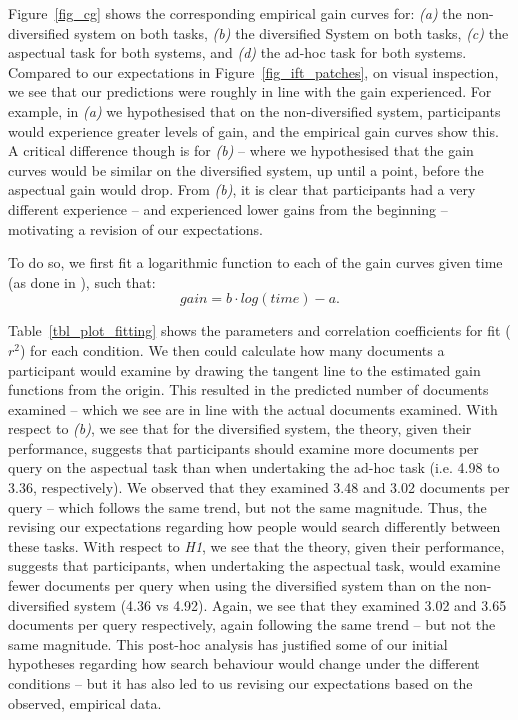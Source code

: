 Figure~\ref{fig_cg} shows the corresponding empirical gain curves for: \textit{(a)} the non-diversified system on both tasks, \textit{(b)} the diversified System on both tasks, \textit{(c)} the aspectual task for both systems, and \textit{(d)} the ad-hoc task for both systems. Compared to our expectations in Figure~\ref{fig_ift_patches}, on visual inspection, we see that our predictions were roughly in line with the gain experienced. For example, in \textit{(a)} we hypothesised that on the non-diversified system, participants would experience greater levels of gain, and the empirical gain curves show this. A critical difference though is for \textit{(b)} -- where we hypothesised that the gain curves would be similar on the diversified system, up until a point, before the aspectual gain would drop. From \textit{(b)}, it is clear that participants had a very different experience -- and experienced lower gains from the beginning -- motivating a revision of our expectations.

To do so, we first fit a logarithmic function to each of the gain curves given time (as done in \cite{ath2014ift}), such that:
\begin{equation}
gain = b \cdot log(time) - a.
\end{equation}

Table~\ref{tbl_plot_fitting} shows the parameters and correlation coefficients for fit ($r^2$) for each condition. We then could calculate how many documents a participant would examine by drawing the tangent line to the estimated gain functions from the origin. This resulted in the predicted number of documents examined -- which we see are in line with the actual documents examined. With respect to \textit{(b)}, we see that for the diversified system, the theory, given their performance, suggests that participants should examine more documents per query on the aspectual task than when undertaking the ad-hoc task (i.e. 4.98 to 3.36, respectively). We observed that they examined 3.48 and 3.02 documents per query -- which follows the same trend, but not the same magnitude. Thus, the revising our expectations regarding how people would search differently between these tasks. With respect to \textit{H1}, we see that the theory, given their performance, suggests that participants, when undertaking the aspectual task, would examine fewer documents per query when using the diversified system than on the non-diversified system (4.36 vs 4.92). Again, we see that they examined 3.02 and 3.65 documents per query respectively, again following the same trend -- but not the same magnitude. This post-hoc analysis has justified some of our initial hypotheses regarding how search behaviour would change under the different conditions -- but it has also led to us revising our expectations based on the observed, empirical data.

